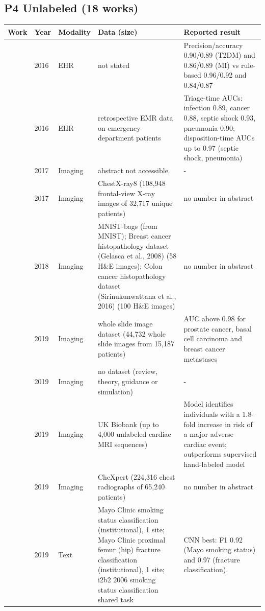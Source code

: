 \subsection*{P4 Unlabeled (18 works)}
\begin{longtable}{@{}p{2.6cm}p{0.7cm}p{1.2cm}p{4.4cm}p{4.6cm}@{}}
\toprule
Work & Year & Modality & Data (size) & Reported result\\
\midrule
\endhead
\cite{agarwal2016learning} & 2016 & EHR & not stated & Precision/accuracy 0.90/0.89 (T2DM) and 0.86/0.89 (MI) vs rule-based 0.96/0.92 and 0.84/0.87\\
\cite{halpern2016electronic} & 2016 & EHR & retrospective EMR data on emergency department patients & Triage-time AUCs: infection 0.89, cancer 0.88, septic shock 0.93, pneumonia 0.90; disposition-time AUCs up to 0.97 (septic shock, pneumonia)\\
\cite{bai2017semi} & 2017 & Imaging & abstract not accessible & -\\
\cite{wang2017chestx} & 2017 & Imaging & ChestX-ray8 (108,948 frontal-view X-ray images of 32,717 unique patients) & no number in abstract\\
\cite{ilse2018attention} & 2018 & Imaging & MNIST-bags (from MNIST); Breast cancer histopathology dataset (Gelasca et al., 2008) (58 H\&E images); Colon cancer histopathology dataset (Sirinukunwattana et al., 2016) (100 H\&E images) & no number in abstract\\
\cite{campanella2019clinical} & 2019 & Imaging & whole slide image dataset (44,732 whole slide images from 15,187 patients) & AUC above 0.98 for prostate cancer, basal cell carcinoma and breast cancer metastases\\
\cite{cheplygina2019not} & 2019 & Imaging & no dataset (review, theory, guidance or simulation) & -\\
\cite{fries2019weakly} & 2019 & Imaging & UK Biobank (up to 4,000 unlabeled cardiac MRI sequences) & Model identifies individuals with a 1.8-fold increase in risk of a major adverse cardiac event; outperforms supervised hand-labeled model\\
\cite{irvin2019chexpert} & 2019 & Imaging & CheXpert (224,316 chest radiographs of 65,240 patients) & no number in abstract\\
\cite{wang2019clinical} & 2019 & Text & Mayo Clinic smoking status classification (institutional), 1 site; Mayo Clinic proximal femur (hip) fracture classification (institutional), 1 site; i2b2 2006 smoking status classification shared task & CNN best: F1 0.92 (Mayo smoking status) and 0.97 (fracture classification).\\

\end{longtable}

